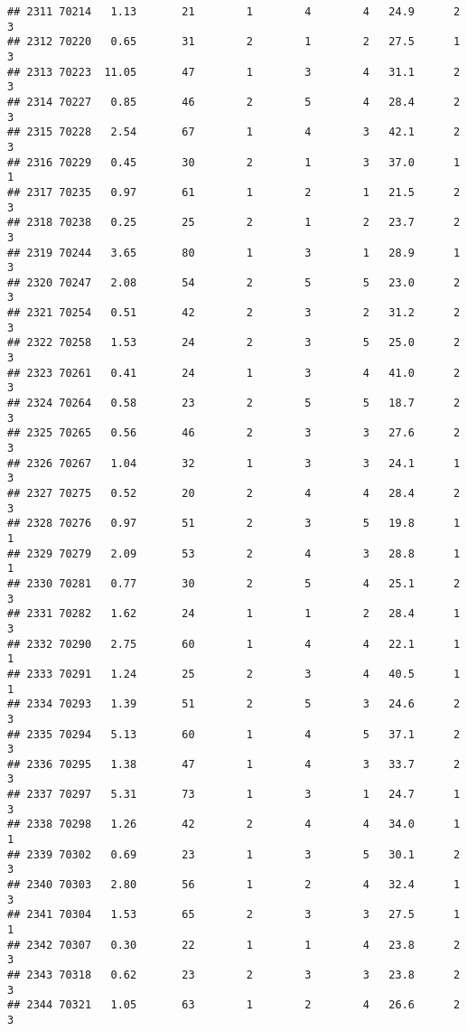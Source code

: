 \documentclass[
]{article}
\begin{document}
\begin{verbatim}
## 2311 70214   1.13       21        1        4        4   24.9      2      3
## 2312 70220   0.65       31        2        1        2   27.5      1      3
## 2313 70223  11.05       47        1        3        4   31.1      2      3
## 2314 70227   0.85       46        2        5        4   28.4      2      3
## 2315 70228   2.54       67        1        4        3   42.1      2      3
## 2316 70229   0.45       30        2        1        3   37.0      1      1
## 2317 70235   0.97       61        1        2        1   21.5      2      3
## 2318 70238   0.25       25        2        1        2   23.7      2      3
## 2319 70244   3.65       80        1        3        1   28.9      1      3
## 2320 70247   2.08       54        2        5        5   23.0      2      3
## 2321 70254   0.51       42        2        3        2   31.2      2      3
## 2322 70258   1.53       24        2        3        5   25.0      2      3
## 2323 70261   0.41       24        1        3        4   41.0      2      3
## 2324 70264   0.58       23        2        5        5   18.7      2      3
## 2325 70265   0.56       46        2        3        3   27.6      2      3
## 2326 70267   1.04       32        1        3        3   24.1      1      3
## 2327 70275   0.52       20        2        4        4   28.4      2      3
## 2328 70276   0.97       51        2        3        5   19.8      1      1
## 2329 70279   2.09       53        2        4        3   28.8      1      1
## 2330 70281   0.77       30        2        5        4   25.1      2      3
## 2331 70282   1.62       24        1        1        2   28.4      1      3
## 2332 70290   2.75       60        1        4        4   22.1      1      1
## 2333 70291   1.24       25        2        3        4   40.5      1      1
## 2334 70293   1.39       51        2        5        3   24.6      2      3
## 2335 70294   5.13       60        1        4        5   37.1      2      3
## 2336 70295   1.38       47        1        4        3   33.7      2      3
## 2337 70297   5.31       73        1        3        1   24.7      1      3
## 2338 70298   1.26       42        2        4        4   34.0      1      1
## 2339 70302   0.69       23        1        3        5   30.1      2      3
## 2340 70303   2.80       56        1        2        4   32.4      1      3
## 2341 70304   1.53       65        2        3        3   27.5      1      1
## 2342 70307   0.30       22        1        1        4   23.8      2      3
## 2343 70318   0.62       23        2        3        3   23.8      2      3
## 2344 70321   1.05       63        1        2        4   26.6      2      3

\end{verbatim}
\end{document}
